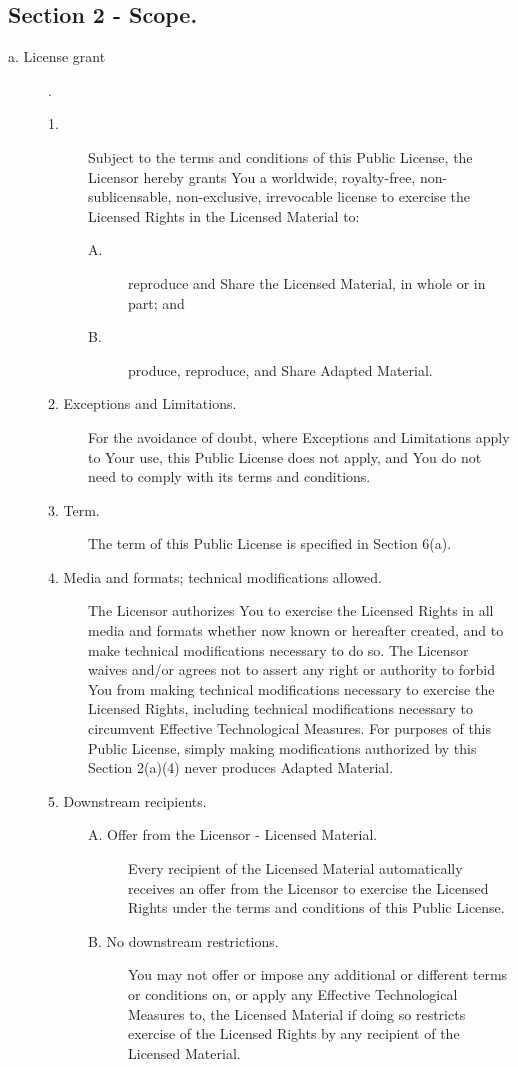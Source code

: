 \subsection{Section 2 - Scope.}
\begin{description}
\item[a. License grant].
\begin{description}
    \item [1.] Subject to the terms and conditions of this Public License, the Licensor hereby grants You a worldwide, royalty-free, non-sublicensable, non-exclusive, irrevocable license to exercise the Licensed Rights in the Licensed Material to:
    \begin{description}
        \item [A.] reproduce and Share the Licensed Material, in whole or in part; and
        \item [B.] produce, reproduce, and Share Adapted Material.
    \end{description}
    \item [2. Exceptions and Limitations.] For the avoidance of doubt, where Exceptions and Limitations apply to Your use, this Public License does not apply, and You do not need to comply with its terms and conditions.
    \item [3. Term.] The term of this Public License is specified in Section 6(a).
    \item [4. Media and formats; technical modifications allowed.] The Licensor authorizes You to exercise the Licensed Rights in all media and formats whether now known or hereafter created, and to make technical modifications necessary to do so. The Licensor waives and/or agrees not to assert any right or authority to forbid You from making technical modifications necessary to exercise the Licensed Rights, including technical modifications necessary to circumvent Effective Technological Measures. For purposes of this Public License, simply making modifications authorized by this Section 2(a)(4) never produces Adapted Material.
    \item [5. Downstream recipients.]
    \begin{description}
        \item [A. Offer from the Licensor - Licensed Material.] Every recipient of the Licensed Material automatically receives an offer from the Licensor to exercise the Licensed Rights under the terms and conditions of this Public License.
        \item [B. No downstream restrictions.] You may not offer or impose any additional or different terms or conditions on, or apply any Effective Technological Measures to, the Licensed Material if doing so restricts exercise of the Licensed Rights by any recipient of the Licensed Material.

\end{description}
\end{description}
\end{description}
